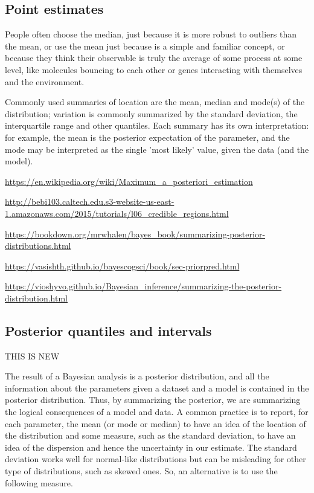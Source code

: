\subsection{Point estimates}

People often choose the median, just because it is more robust to outliers than the mean, or use the mean just because is a simple and familiar concept, or because they think their observable is truly the average of some process at some level, like molecules bouncing to each other or genes interacting with themselves and the environment.

Commonly used summaries of location are the mean, median and mode(s) of the distribution; variation is commonly summarized by the standard deviation, the interquartile range and other quantiles. Each summary has its own interpretation: for example, the mean is the posterior expectation of the parameter, and the mode may be interpreted as the single 'most likely' value, given the data (and the model).

\url{https://en.wikipedia.org/wiki/Maximum_a_posteriori_estimation}

\url{http://bebi103.caltech.edu.s3-website-us-east-1.amazonaws.com/2015/tutorials/l06_credible_regions.html}

\url{https://bookdown.org/mrwhalen/bayes_book/summarizing-posterior-distributions.html}

\url{https://vasishth.github.io/bayescogsci/book/sec-priorpred.html}

\url{https://vioshyvo.github.io/Bayesian_inference/summarizing-the-posterior-distribution.html}

\subsection{Posterior quantiles and intervals}




THIS IS NEW

The result of a Bayesian analysis is a posterior distribution, and all the information about the parameters given a dataset and a model is contained in the posterior distribution. Thus, by summarizing the posterior, we are summarizing the logical consequences of a model and data. A common practice is to report, for each parameter, the mean (or mode or median) to have an idea of the location of the distribution and some measure, such as the standard deviation, to have an idea of the dispersion and hence the uncertainty in our estimate. The standard deviation works well for normal-like distributions but can be misleading for other type of distributions, such as skewed ones. So, an alternative is to use the following measure.

